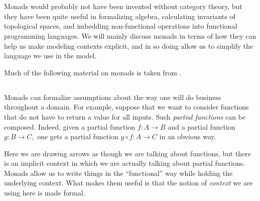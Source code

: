 \documentclass[../main/CT4S-EN-RU]{subfiles}
\begin{document}
\section{}\label{sec:monads}

\begin{blockENG}
Monads would probably not have been invented without category theory, but they have been quite useful in formalizing algebra, calculating invariants of topological spaces, and imbedding non-functional operations into functional programming languages. We will mainly discuss monads in terms of how they can help us make modeling contexts explicit, and in so doing allow us to simplify the language we use in the model.
\end{blockENG}

\begin{blockRUS}
\end{blockRUS}

\begin{blockENG}
Much of the following material on monads is taken from \cite{Sp3}.
\end{blockENG}

\begin{blockRUS}
\end{blockRUS}


\subsection{}

\begin{blockENG}
Monads can formalize assumptions about the way one will do business throughout a domain. For example, suppose that we want to consider functions that do not have to return a value for all inputs. Such {\em partial functions} can be composed. Indeed, given a partial function $f\colon A{→} B$ and a partial function $g\colon B{→} C,$ one gets a partial function $g\circ f\colon A{→} C$ in an obvious way.
\end{blockENG}

\begin{blockRUS}
\end{blockRUS}

\begin{blockENG}
Here we are drawing arrows as though we are talking about functions, but there is an implicit context in which we are actually talking about partial functions. Monads allow us to write things in the “functional” way while holding the underlying context. What makes them useful is that the notion of {\em context} we are using here is made formal.
\end{blockENG}
\end{document}
